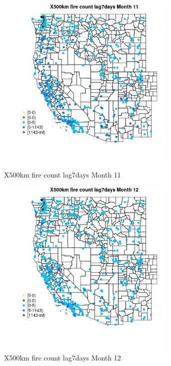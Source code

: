 \begin{figure} 
\centering  
\includegraphics[width=0.77\textwidth]{Code_Outputs/Report_ML_input_PM25_Step4_part_e_de_duplicated_aves_compiled_2019-05-14wNAs_MapObsMo11X500km_fire_count_lag7days.jpg} 
\caption{\label{fig:Report_ML_input_PM25_Step4_part_e_de_duplicated_aves_compiled_2019-05-14wNAsMapObsMo11X500km_fire_count_lag7days}X500km fire count lag7days Month 11} 
\end{figure} 
 

\begin{figure} 
\centering  
\includegraphics[width=0.77\textwidth]{Code_Outputs/Report_ML_input_PM25_Step4_part_e_de_duplicated_aves_compiled_2019-05-14wNAs_MapObsMo12X500km_fire_count_lag7days.jpg} 
\caption{\label{fig:Report_ML_input_PM25_Step4_part_e_de_duplicated_aves_compiled_2019-05-14wNAsMapObsMo12X500km_fire_count_lag7days}X500km fire count lag7days Month 12} 
\end{figure} 
 


